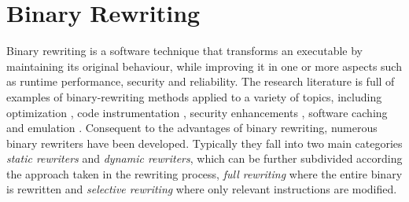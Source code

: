 \chapter{Binary Rewriting}
\label{binary_rewriting}

Binary rewriting is a software technique that transforms an executable by maintaining its original behaviour, while improving it in one or more aspects such as runtime performance, security and reliability. The research literature is full of examples of binary-rewriting methods applied to a variety of topics, including optimization \cite{Romer97instrumentationand}, code instrumentation \cite{PEBIL, BIRD}, security enhancements \cite{vx32}, software caching \cite{Valgrind, DynamoRio} and emulation \cite{Qemu}. Consequent to the advantages of binary rewriting, numerous binary rewriters have been developed. Typically they fall into two main categories \emph{static rewriters} and \emph{dynamic rewriters}, which can be further subdivided according the approach taken in the rewriting process, \emph{full rewriting} where the entire binary is rewritten and \emph{selective rewriting} where only relevant instructions are modified. 
